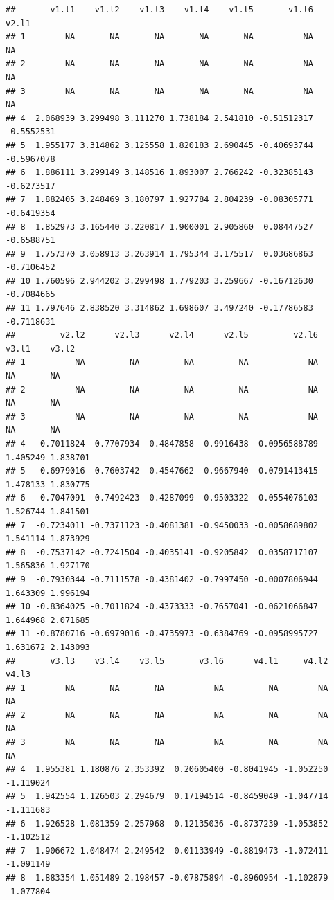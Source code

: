 \documentclass[
]{book}
\begin{document}
\begin{verbatim}
##       v1.l1    v1.l2    v1.l3    v1.l4    v1.l5       v1.l6      v2.l1
## 1        NA       NA       NA       NA       NA          NA         NA
## 2        NA       NA       NA       NA       NA          NA         NA
## 3        NA       NA       NA       NA       NA          NA         NA
## 4  2.068939 3.299498 3.111270 1.738184 2.541810 -0.51512317 -0.5552531
## 5  1.955177 3.314862 3.125558 1.820183 2.690445 -0.40693744 -0.5967078
## 6  1.886111 3.299149 3.148516 1.893007 2.766242 -0.32385143 -0.6273517
## 7  1.882405 3.248469 3.180797 1.927784 2.804239 -0.08305771 -0.6419354
## 8  1.852973 3.165440 3.220817 1.900001 2.905860  0.08447527 -0.6588751
## 9  1.757370 3.058913 3.263914 1.795344 3.175517  0.03686863 -0.7106452
## 10 1.760596 2.944202 3.299498 1.779203 3.259667 -0.16712630 -0.7084665
## 11 1.797646 2.838520 3.314862 1.698607 3.497240 -0.17786583 -0.7118631
##         v2.l2      v2.l3      v2.l4      v2.l5         v2.l6    v3.l1    v3.l2
## 1          NA         NA         NA         NA            NA       NA       NA
## 2          NA         NA         NA         NA            NA       NA       NA
## 3          NA         NA         NA         NA            NA       NA       NA
## 4  -0.7011824 -0.7707934 -0.4847858 -0.9916438 -0.0956588789 1.405249 1.838701
## 5  -0.6979016 -0.7603742 -0.4547662 -0.9667940 -0.0791413415 1.478133 1.830775
## 6  -0.7047091 -0.7492423 -0.4287099 -0.9503322 -0.0554076103 1.526744 1.841501
## 7  -0.7234011 -0.7371123 -0.4081381 -0.9450033 -0.0058689802 1.541114 1.873929
## 8  -0.7537142 -0.7241504 -0.4035141 -0.9205842  0.0358717107 1.565836 1.927170
## 9  -0.7930344 -0.7111578 -0.4381402 -0.7997450 -0.0007806944 1.643309 1.996194
## 10 -0.8364025 -0.7011824 -0.4373333 -0.7657041 -0.0621066847 1.644968 2.071685
## 11 -0.8780716 -0.6979016 -0.4735973 -0.6384769 -0.0958995727 1.631672 2.143093
##       v3.l3    v3.l4    v3.l5       v3.l6      v4.l1     v4.l2     v4.l3
## 1        NA       NA       NA          NA         NA        NA        NA
## 2        NA       NA       NA          NA         NA        NA        NA
## 3        NA       NA       NA          NA         NA        NA        NA
## 4  1.955381 1.180876 2.353392  0.20605400 -0.8041945 -1.052250 -1.119024
## 5  1.942554 1.126503 2.294679  0.17194514 -0.8459049 -1.047714 -1.111683
## 6  1.926528 1.081359 2.257968  0.12135036 -0.8737239 -1.053852 -1.102512
## 7  1.906672 1.048474 2.249542  0.01133949 -0.8819473 -1.072411 -1.091149
## 8  1.883354 1.051489 2.198457 -0.07875894 -0.8960954 -1.102879 -1.077804

\end{verbatim}
\end{document}

